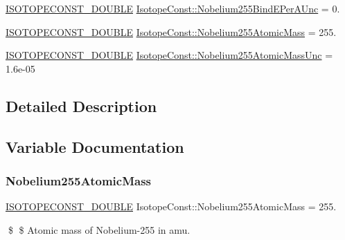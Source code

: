 \begin{DoxyCompactItemize}
\mbox{\hyperlink{group___isotope_const-_macros_ga8f45a7272ce02c0b4c65c44636ed719a}{I\+S\+O\+T\+O\+P\+E\+C\+O\+N\+S\+T\+\_\+\+D\+O\+U\+B\+LE}} \mbox{\hyperlink{group___isotope_const-_nobelium-_no255_gaaaa0b0059ac018c09a8df104e069330e}{Isotope\+Const\+::\+Nobelium255\+Bind\+E\+Per\+A\+Unc}} = 0.
\item 
\mbox{\hyperlink{group___isotope_const-_macros_ga8f45a7272ce02c0b4c65c44636ed719a}{I\+S\+O\+T\+O\+P\+E\+C\+O\+N\+S\+T\+\_\+\+D\+O\+U\+B\+LE}} \mbox{\hyperlink{group___isotope_const-_nobelium-_no255_gaa691e9655ef573b20d3591afec6fe6b3}{Isotope\+Const\+::\+Nobelium255\+Atomic\+Mass}} = 255.
\item 
\mbox{\hyperlink{group___isotope_const-_macros_ga8f45a7272ce02c0b4c65c44636ed719a}{I\+S\+O\+T\+O\+P\+E\+C\+O\+N\+S\+T\+\_\+\+D\+O\+U\+B\+LE}} \mbox{\hyperlink{group___isotope_const-_nobelium-_no255_ga01ef850e45bb17c30d365a74a7ed2b3d}{Isotope\+Const\+::\+Nobelium255\+Atomic\+Mass\+Unc}} = 1.\+6e-\/05
\end{DoxyCompactItemize}


\subsection{Detailed Description}


\subsection{Variable Documentation}
\mbox{\label{group___isotope_const-_nobelium-_no255_gaa691e9655ef573b20d3591afec6fe6b3}} 
\subsubsection{\texorpdfstring{Nobelium255\+Atomic\+Mass}{Nobelium255AtomicMass}}
{\footnotesize\ttfamily \mbox{\hyperlink{group___isotope_const-_macros_ga8f45a7272ce02c0b4c65c44636ed719a}{I\+S\+O\+T\+O\+P\+E\+C\+O\+N\+S\+T\+\_\+\+D\+O\+U\+B\+LE}} Isotope\+Const\+::\+Nobelium255\+Atomic\+Mass = 255.}

\$ \$ Atomic mass of Nobelium-\/255 in amu. \mbox{\label{group___isotope_const-_nobelium-_no255_ga01ef850e45bb17c30d365a74a7ed2b3d}} 
